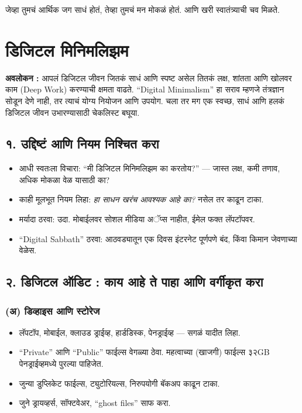 जेव्हा तुमचं आर्थिक जग साधं होतं,  
तेव्हा तुमचं मन मोकळं होतं.  
आणि खरी स्वातंत्र्याची चव मिळते.  


\chapter{डिजिटल मिनिमलिझम}

\textbf{अवलोकन :}  
आपलं डिजिटल जीवन जितकं साधं आणि स्पष्ट असेल तितकं लक्ष, शांतता आणि खोलवर काम (Deep Work) करण्याची क्षमता वाढते. “Digital Minimalism” हा सराव म्हणजे तंत्रज्ञान सोडून देणे नाही, तर त्याचं योग्य नियोजन आणि उपयोग. चला तर मग एक स्वच्छ, साधं आणि हलकं डिजिटल जीवन उभारण्यासाठी चेकलिस्ट बघूया.  

\section*{१. उद्दिष्टं आणि नियम निश्चित करा}

\begin{itemize}
  \item आधी स्वतःला विचारा: “मी डिजिटल मिनिमलिझम का करतोय?” — जास्त लक्ष, कमी तणाव, अधिक मोकळा वेळ यासाठी का?  
  \item काही मूलभूत नियम लिहा: \textit{हा साधन खरंच आवश्यक आहे का?} नसेल तर काढून टाका.  
  \item मर्यादा ठरवा: उदा. मोबाईलवर सोशल मीडिया अॅप्स नाहीत, ईमेल फक्त लॅपटॉपवर.  
  \item “Digital Sabbath” ठरवा: आठवड्यातून एक दिवस इंटरनेट पूर्णपणे बंद, किंवा किमान जेवणाच्या वेळेस.  
\end{itemize}

\section*{२. डिजिटल ऑडिट : काय आहे ते पाहा आणि वर्गीकृत करा}

\subsection*{(अ) डिव्हाइस आणि स्टोरेज}
\begin{itemize}
  \item लॅपटॉप, मोबाईल, क्लाउड ड्राईव्ह, हार्डडिस्क, पेनड्राईव्ह — सगळं यादीत लिहा.  
  \item “Private” आणि “Public” फाईल्स वेगळ्या ठेवा. महत्वाच्या (खाजगी) फाईल्स ३२GB पेनड्राईव्हमध्ये पुरल्या पाहिजेत.  
  \item जुन्या डुप्लिकेट फाईल्स, ट्युटोरियल्स, निरुपयोगी बॅकअप काढून टाका.  
  \item जुने ड्रायव्हर्स, सॉफ्टवेअर, “ghost files” साफ करा.  
\end{itemize}

